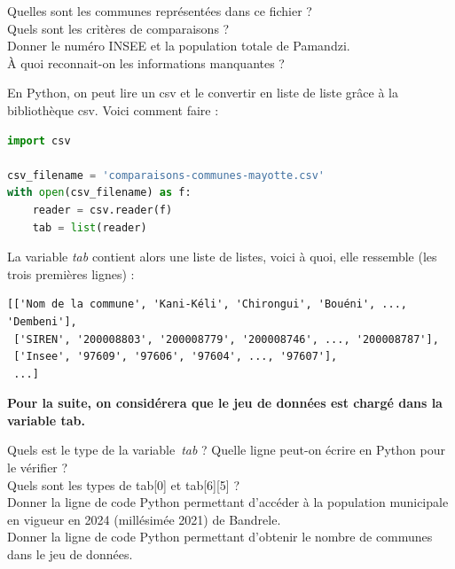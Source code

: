 \begin{Exercise}[title={Comprendre un csv}]
\Question Quelles sont les communes représentées dans ce fichier ?\\
\emptybox{1.5cm}
\Question Quels sont les critères de comparaisons ?\\
\emptybox{1.5cm}
\Question Donner le numéro INSEE et la population totale de Pamandzi.\\
\emptybox{1.5cm}
\Question À quoi reconnait-on les informations manquantes ?\\
\emptybox{3cm}
\end{Exercise}

\begin{Exercise}[title={Manipuler les csv en Python}]

En Python, on peut lire un csv et le convertir en liste de liste grâce à la bibliothèque csv. Voici comment faire :
\begin{lstlisting}[style=Pythonstyle, language=Python]
import csv

csv_filename = 'comparaisons-communes-mayotte.csv'
with open(csv_filename) as f:
    reader = csv.reader(f)
    tab = list(reader)
\end{lstlisting}

La variable \textit{tab} contient alors une liste de listes, voici à quoi, elle ressemble (les trois premières lignes) :
\begin{Verbatim}[fontsize=\small]
[['Nom de la commune', 'Kani-Kéli', 'Chirongui', 'Bouéni', ..., 'Dembeni'],
 ['SIREN', '200008803', '200008779', '200008746', ..., '200008787'],
 ['Insee', '97609', '97606', '97604', ..., '97607'],
 ...]
\end{Verbatim}


\begin{center}
{\Large}\textbf{Pour la suite, on considérera que le jeu de données est chargé dans la variable tab.}{\Large}
\end{center}


\Question Quels est le type de la variable~\textit{tab} ? Quelle ligne peut-on écrire en Python pour le vérifier ?\\
\emptybox{1.5cm}
\Question Quels sont les types de tab[0] et tab[6][5]  ?\\
\emptybox{1.5cm}
\Question Donner la ligne de code Python permettant d'accéder à la population municipale en vigueur en 2024 (millésimée 2021) de Bandrele.\\
\emptybox{1.5cm}
\Question Donner la ligne de code Python permettant d'obtenir le nombre de communes dans le jeu de données.\\
\emptybox{1.5cm}
\vfill


\end{Exercise}
